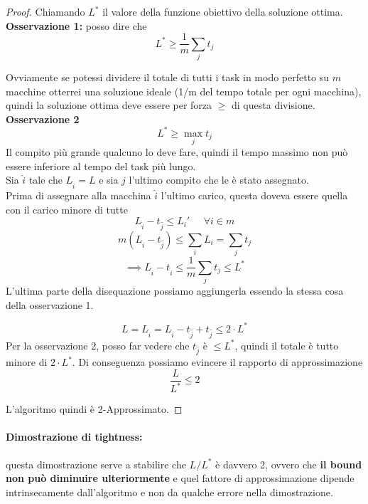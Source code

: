 \begin{proof}
	Chiamando $L^\ast$ il valore della funzione obiettivo della soluzione ottima. \\
	
	\textbf{Osservazione 1:} posso dire che 
	$$ L^\ast \geq \frac{1}{m} \sum_{j} t_j $$
	
	Ovviamente se potessi dividere il totale di tutti i task in modo perfetto su $m$ macchine otterrei una soluzione ideale (1/m del tempo totale per ogni macchina), quindi la soluzione ottima deve essere per forza $\geq$ di questa divisione.\\
	
	\textbf{Osservazione 2 }
	$$ L^\ast \geq \max_j t_j $$
	Il compito più grande qualcuno lo deve fare, quindi il tempo massimo non può essere inferiore al tempo del task più lungo.\\
	
	Sia $\hat{i}$ tale che $L_{\hat{i}} = L$ e sia $\hat{j}$ l'ultimo compito che le è stato assegnato.\\
	
	Prima di assegnare alla macchina $\hat{i}$ l'ultimo carico, questa doveva essere quella con il carico minore di tutte
	$$ L_{\hat{i}} - t_{\hat{j}} \leq L_i ' \;\;\;\;\; \forall i \in m $$
	$$ m (L_{\hat{i}} - t_{\hat{j}}) \leq \sum_i L_i = \sum_j t_j $$
	$$ \implies L_{\hat{i}} - t_{\hat{i}} \leq \frac{1}{m} \sum_j t_j \leq L^\ast $$
	L'ultima parte della disequazione possiamo aggiungerla essendo la stessa cosa della osservazione 1.
	
	$$ L = L_{\hat{i}} = L_{\hat{i}} - t_{\hat{j}} + t_{\hat{j}} \leq 2 \cdot L^\ast $$
	Per la osservazione 2, posso far vedere che $t_{\hat{j}}$ è $\leq L^\ast$, quindi il totale è tutto minore di $2 \cdot L^\ast$. Di conseguenza possiamo evincere il rapporto di approssimazione
	$$ \frac{L}{L^\ast} \leq 2 $$
	
	L'algoritmo quindi è 2-Approssimato.
\end{proof}

\newpage


\paragraph{Dimostrazione di tightness:} questa dimostrazione serve a stabilire che $L/L^\ast$ è davvero 2, ovvero che \textbf{il bound non può diminuire ulteriormente} e quel fattore di approssimazione dipende intrinsecamente dall'algoritmo e non da qualche errore nella dimostrazione.\\

